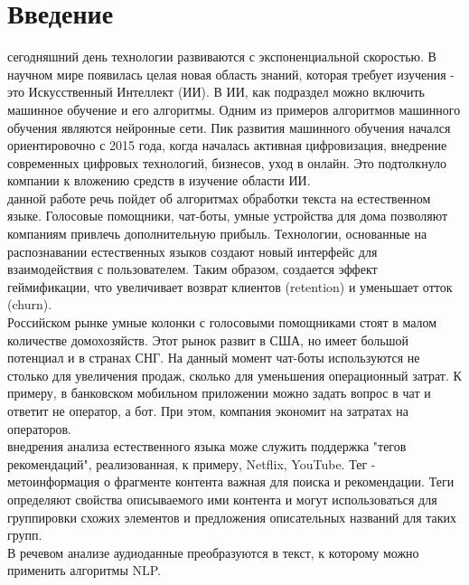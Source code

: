 \documentclass{article}
\newcommand\tab[1][1cm]{\hspace*{#1}}
\begin{document}
\renewcommand*\contentsname{Содержание}
\makeatletter
\renewcommand{\l@section}{\@dottedtocline{1}{0em}{2em}}
\renewcommand{\l@subsection}{\@dottedtocline{1}{0em}{2.6em}}
\renewcommand{\l@subsubsection}{\@dottedtocline{1}{0em}{3.2em}}

\makeatother
\setcounter{page}{2}

\begin{center}
	\tableofcontents
\end{center}
\newpage
{}
\section*{Введение}
 сегодняшний день технологии развиваются с экспоненциальной скоростью. В научном мире появилась целая новая область знаний, которая требует изучения - это Искусственный Интеллект (ИИ). В ИИ, как подраздел можно включить машинное обучение и его алгоритмы. Одним из примеров алгоритмов машинного обучения являются нейронные сети. Пик развития машинного обучения начался ориентировочно с 2015 года, когда началась активная цифровизация, внедрение современных цифровых технологий, бизнесов, уход в онлайн. Это подтолкнуло компании к вложению средств в изучение области ИИ.\\
 данной работе речь пойдет об алгоритмах обработки текста на естественном языке. Голосовые помощники, чат-боты, умные устройства для дома позволяют компаниям привлечь дополнительную прибыль. Технологии, основанные на распознавании естественных языков создают новый интерфейс для взаимодействия с пользователем. Таким образом, создается эффект геймификации, что увеличивает возврат клиентов (retention) и уменьшает отток (churn).\\
 Российском рынке умные колонки с голосовыми помощниками стоят в малом количестве домохозяйств. Этот рынок развит в США, но имеет большой потенциал и в странах СНГ. На данный момент чат-боты используются не столько для увеличения продаж, сколько для уменьшения операционный затрат. К примеру, в банковском мобильном приложении можно задать вопрос в чат и ответит не оператор, а бот. При этом, компания экономит на затратах на операторов.\\
 внедрения анализа естественного языка може служить поддержка "тегов рекомендаций", реализованная, к примеру, Netflix, YouTube. Тег - метоинформация о фрагменте контента важная для поиска и рекомендации. Теги определяют свойства описываемого ими контента и могут использоваться для группировки схожих элементов и предложения описательных названий для таких групп.\\
В речевом анализе аудиоданные преобразуются в текст, к которому можно применить алгоритмы NLP.
\newpage
\end{document}
